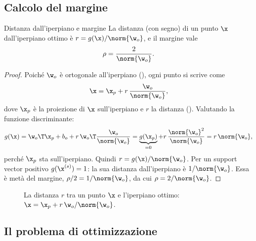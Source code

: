 \subsection{Calcolo del margine}

\begin{proprieta}{Distanza dall'iperpiano e margine}
La distanza (con segno) di un punto $\x$ dall'iperpiano ottimo è $r = g(\x)/\norm{\w_o}$, e il margine vale
\[
\rho = \frac{2}{\norm{\w_o}} .
\]
\end{proprieta}
\begin{proof}
Poiché $\w_o$ è ortogonale all'iperpiano (), ogni punto si scrive come
\[
\x = \x_p + r\,\frac{\w_o}{\norm{\w_o}},
\]
dove $\x_p$ è la proiezione di $\x$ sull'iperpiano e $r$ la distanza (). Valutando la
funzione discriminante:
\[
g(\x) = \w_o\T\x_p + b_o + r\,\w_o\T\frac{\w_o}{\norm{\w_o}} = \underbrace{g(\x_p)}_{=0} + r\,\frac{\norm{\w_o}^2}{\norm{\w_o}} = r\,\norm{\w_o},
\]
perché $\x_p$ sta sull'iperpiano. Quindi $r = g(\x)/\norm{\w_o}$. Per un support vector positivo $g(\x^{(s)})=1$:
la sua distanza dall'iperpiano è $1/\norm{\w_o}$. Essa è metà del margine, $\rho/2 = 1/\norm{\w_o}$, da cui
$\rho = 2/\norm{\w_o}$.
\end{proof}

\begin{figure}[ht]
\centering
{}
\caption{La distanza $r$ tra un punto $\x$ e l'iperpiano ottimo: $\x = \x_p + r\,\w_o/\norm{\w_o}$.}
\label{fig:distanza}
\end{figure}

\subsection{Il problema di ottimizzazione}

